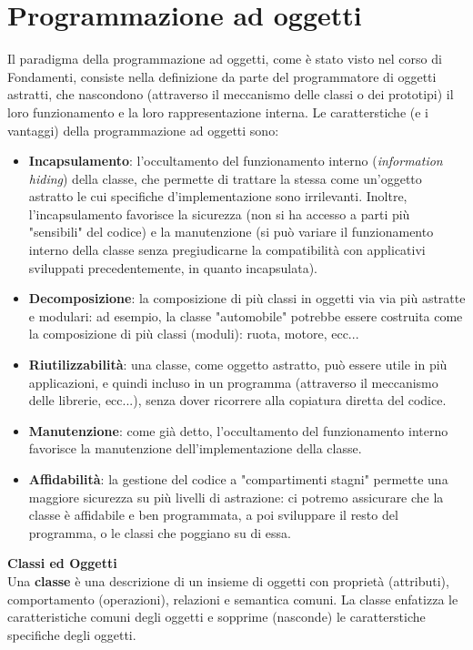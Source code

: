 \documentclass[a4paper,12pt]{article}
\begin{document}
\section{Programmazione ad oggetti}
Il paradigma della programmazione ad oggetti, come è stato visto nel corso di Fondamenti, consiste nella definizione
da parte del programmatore di oggetti astratti, che nascondono (attraverso il meccanismo delle classi o dei prototipi) il
loro funzionamento e la loro rappresentazione interna. Le caratterstiche (e i vantaggi) della programmazione ad oggetti sono:
\begin{itemize}
  \item \textbf{Incapsulamento}: l'occultamento del funzionamento interno (\textit{information hiding}) della classe, che permette
    di trattare la stessa come un'oggetto astratto le cui specifiche d'implementazione sono irrilevanti. Inoltre, l'incapsulamento
    favorisce la sicurezza (non si ha accesso a parti più "sensibili" del codice) e la manutenzione (si può variare il funzionamento interno
    della classe senza pregiudicarne la compatibilità con applicativi sviluppati precedentemente, in quanto incapsulata).
  \item \textbf{Decomposizione}: la composizione di più classi in oggetti via via più astratte e modulari: ad esempio, la classe "automobile" potrebbe essere
    costruita come la composizione di più classi (moduli): ruota, motore, ecc...
  \item \textbf{Riutilizzabilità}: una classe, come oggetto astratto, può essere utile in più applicazioni, e quindi incluso in un programma
    (attraverso il meccanismo delle librerie, ecc...), senza dover ricorrere alla copiatura diretta del codice.
  \item \textbf{Manutenzione}: come già detto, l'occultamento del funzionamento interno favorisce la manutenzione dell'implementazione della classe.
  \item \textbf{Affidabilità}: la gestione del codice a "compartimenti stagni" permette una maggiore sicurezza su più livelli di astrazione: ci potremo
    assicurare che la classe è affidabile e ben programmata, a poi sviluppare il resto del programma, o le classi che poggiano su di essa.
\end{itemize}
\par\smallskip
\textbf{Classi ed Oggetti} \\
Una \textbf{classe} è una descrizione di un insieme di oggetti con proprietà (attributi), comportamento (operazioni), relazioni
e semantica comuni. La classe enfatizza le caratteristiche comuni degli oggetti e sopprime (nasconde) le caratterstiche specifiche degli oggetti.
\end{document}
